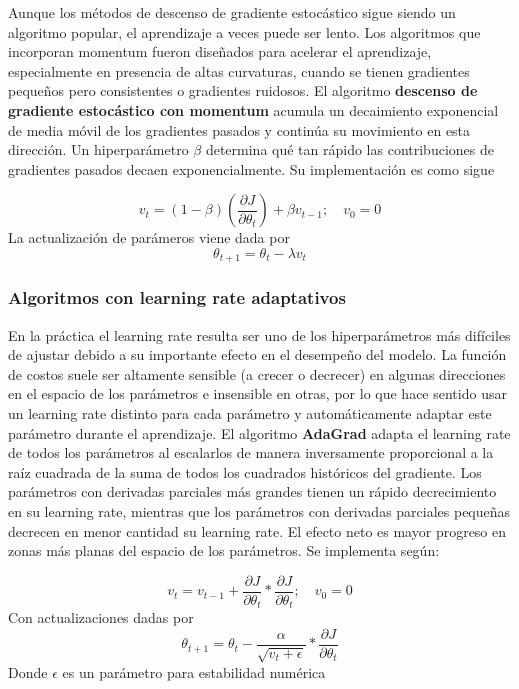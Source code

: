 Aunque los métodos de descenso de gradiente estoc\'astico sigue siendo un algoritmo popular, el aprendizaje a veces puede ser lento. Los algoritmos que incorporan momentum fueron dise{\~{n}}ados para acelerar el aprendizaje, especialmente en presencia de altas curvaturas, cuando se tienen gradientes peque{\~{n}}os pero consistentes o gradientes ruidosos. El algoritmo \textbf{descenso de gradiente estoc\'astico con momentum} acumula un decaimiento exponencial de media m\'ovil de los gradientes pasados y contin\'ua su movimiento en esta direcci\'on. Un hiperpar\'ametro $\beta$ determina qu\'e tan r\'apido las contribuciones de gradientes pasados decaen exponencialmente. Su implementación es como sigue 

\[
v_t = (1-\beta) \left ( \frac{\partial J}{\partial \theta_t} \right ) + \beta v_{t-1};  \quad v_0 = 0
\]
La actualización de parámeros viene dada por 
\[
\theta_{t+1} = \theta_t - \lambda v_t
\]

\subsubsection{Algoritmos con learning rate adaptativos}

En la pr\'actica el learning rate resulta ser uno de los hiperpar\'ametros m\'as dif\'iciles de ajustar debido a su importante efecto en el desempe{\~{n}}o del modelo. La funci\'on de costos suele ser altamente sensible (a crecer o decrecer) en algunas direcciones en el espacio de los par\'ametros e insensible en otras, por lo que hace sentido usar un learning rate distinto para cada par\'ametro y autom\'aticamente adaptar este par\'ametro durante el aprendizaje. El algoritmo \textbf{AdaGrad} adapta el learning rate de todos los par\'ametros al escalarlos de manera inversamente proporcional a la ra\'iz cuadrada de la suma de todos los cuadrados hist\'oricos del gradiente. Los par\'ametros con derivadas parciales m\'as grandes tienen un r\'apido decrecimiento en su learning rate, mientras que los par\'ametros con derivadas parciales peque{\~{n}}as decrecen en menor cantidad su learning rate. El efecto neto es mayor progreso en zonas m\'as planas del espacio de los par\'ametros. Se implementa según:

\[
v_{t} = v_{t-1} +  \frac{\partial J}{\partial \theta_t} * \frac{\partial J}{\partial \theta_t} ; \quad v_0 = 0
\] 
Con actualizaciones dadas por 
\[
\theta_{t+1} = \theta_t - \frac{\alpha}{\sqrt{v_t + \epsilon}} * \frac{\partial J}{\partial \theta_t}
\]
Donde $\epsilon$ es un parámetro para estabilidad numérica

